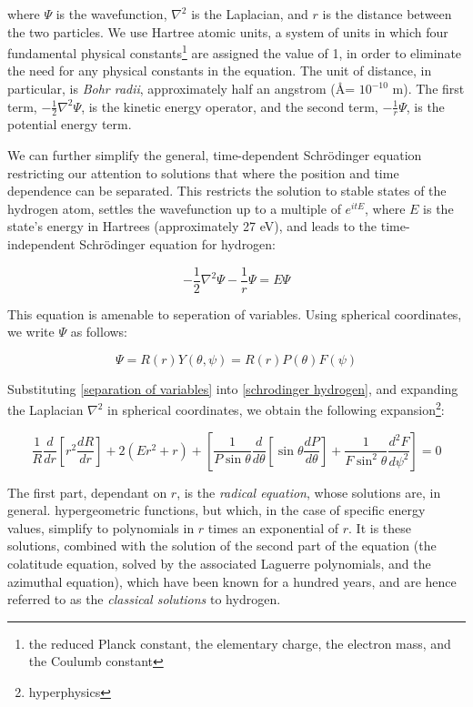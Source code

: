 \documentclass{article}
\begin{document}
where $\Psi$ is the wavefunction, $\nabla^2$ is the Laplacian,
and $r$ is the distance between the two particles.  We use Hartree atomic units,
a system of units in which four fundamental physical constants\footnote{the reduced Planck
constant, the elementary charge, the electron mass, and the Coulumb constant} are
assigned the value of 1, in order to eliminate the need for any
physical constants in the equation.  The unit of distance, in particular,
is {\it Bohr radii}, approximately half an angstrom (\AA = $10^{-10}$ m).
The first term, $-\frac{1}{2}\nabla^2 \Psi$,
is the kinetic energy operator, and the second term, $-\frac{1}{r}\Psi$, is
the potential energy term.

We can further simplify the general, time-dependent Schr\"odinger equation
restricting our attention to solutions that where the position and
time dependence can be separated.
This restricts the solution to stable states
of the hydrogen atom, settles the wavefunction up to a multiple of $e^{itE}$,
where $E$ is the state's energy in Hartrees (approximately 27 eV),
and leads to the time-independent Schr\"odinger equation for hydrogen:

\begin{equation}
\label{schrodinger hydrogen}
-\frac{1}{2}\nabla^2 \Psi - \frac{1}{r}\Psi = E \Psi
\end{equation}

This equation is amenable to seperation of variables.
Using spherical coordinates, we write $\Psi$ as follows:

\begin{equation}
\label{separation of variables}
\Psi=R(r)Y(\theta, \psi) = R(r)P(\theta)F(\psi)
\end{equation}

Substituting \eqref{separation of variables} into \eqref{schrodinger hydrogen},
and expanding the Laplacian $\nabla^2$ in spherical coordinates,
we obtain the following expansion\footnote{hyperphysics}:

\begin{equation*}
\frac{1}{R} \frac{d}{dr}\left[ r^2 \frac{dR}{dr}\right] + 2(Er^2 + r)
+ \left[\frac{1}{P\sin\theta} \frac{d}{d\theta}\left[\sin\theta\frac{dP}{d\theta}\right]+\frac{1}{F\sin^2\theta}\frac{d^2 F}{d\psi^2}\right] = 0
\end{equation*}

The first part, dependant on $r$, is the {\it radical equation}, whose solutions are, in general.
hypergeometric functions, but which, in the case of specific energy values,
simplify to polynomials in $r$
times an exponential of $r$.  It is these solutions, combined with the solution
of the second part of the equation (the colatitude equation, solved by the associated Laguerre polynomials,
and the azimuthal equation), which have been known for a hundred years, and are
hence referred to as the {\it classical solutions} to hydrogen.
\end{document}
